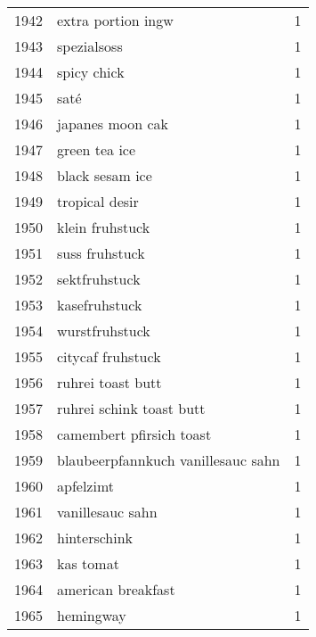 \begin{tabular}{llr}
1942 &                                 extra portion ingw &      1 \\
1943 &                                        spezialsoss &      1 \\
1944 &                                        spicy chick &      1 \\
1945 &                                               saté &      1 \\
1946 &                                   japanes moon cak &      1 \\
1947 &                                      green tea ice &      1 \\
1948 &                                    black sesam ice &      1 \\
1949 &                                     tropical desir &      1 \\
1950 &                                    klein fruhstuck &      1 \\
1951 &                                     suss fruhstuck &      1 \\
1952 &                                      sektfruhstuck &      1 \\
1953 &                                      kasefruhstuck &      1 \\
1954 &                                     wurstfruhstuck &      1 \\
1955 &                                  citycaf fruhstuck &      1 \\
1956 &                                  ruhrei toast butt &      1 \\
1957 &                           ruhrei schink toast butt &      1 \\
1958 &                           camembert pfirsich toast &      1 \\
1959 &                 blaubeerpfannkuch vanillesauc sahn &      1 \\
1960 &                                          apfelzimt &      1 \\
1961 &                                   vanillesauc sahn &      1 \\
1962 &                                       hinterschink &      1 \\
1963 &                                          kas tomat &      1 \\
1964 &                                 american breakfast &      1 \\
1965 &                                          hemingway &      1 \\

\end{tabular}
